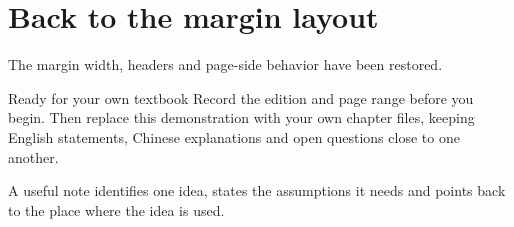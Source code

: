 \section{Back to the margin layout}
The margin width, headers and page-side behavior have been restored.
\begin{readingbox}{Ready for your own textbook}
Record the edition and page range before you begin. Then replace this
demonstration with your own chapter files, keeping English statements,
Chinese explanations and open questions close to one another.
\end{readingbox}
\begin{definition}
A useful note identifies one idea, states the assumptions it needs and
points back to the place where the idea is used.
\end{definition}

